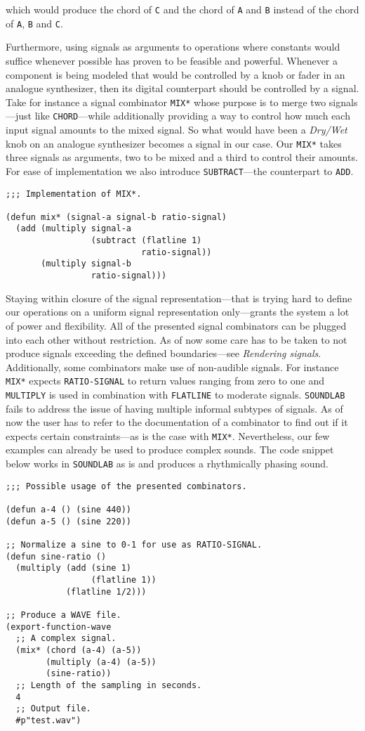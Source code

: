 which would produce the chord of \texttt{C} and the chord of \texttt{A}
and \texttt{B} instead of the chord of \texttt{A}, \texttt{B} and
\texttt{C}.

Furthermore, using signals as arguments to operations where constants
would suffice whenever possible has proven to be feasible and powerful.
Whenever a component is being modeled that would be controlled by a knob
or fader in an analogue synthesizer, then its digital counterpart should
be controlled by a signal. Take for instance a signal combinator
\texttt{MIX*} whose purpose is to merge two signals---just like
\texttt{CHORD}---while additionally providing a way to control how much
each input signal amounts to the mixed signal. So what would have been a
\textit{Dry/Wet} knob on an analogue synthesizer becomes a signal in our
case. Our \texttt{MIX*} takes three signals as arguments, two to be mixed
and a third to control their amounts. For ease of implementation we also
introduce \texttt{SUBTRACT}---the counterpart to \texttt{ADD}.

\begin{verbatim}
;;; Implementation of MIX*.

(defun mix* (signal-a signal-b ratio-signal)
  (add (multiply signal-a
                 (subtract (flatline 1)
                           ratio-signal))
       (multiply signal-b
                 ratio-signal)))
\end{verbatim}

Staying within closure of the signal representation---that is trying
hard to define our operations on a uniform signal representation
only---grants the system a lot of power and flexibility. All of the
presented signal combinators can be plugged into each other without
restriction. As of now some care has to be taken to not produce signals
exceeding the defined boundaries---see \textit{Rendering signals}.
Additionally, some combinators make use of non-audible signals. For
instance \texttt{MIX*} expects \texttt{RATIO-SIGNAL} to return values
ranging from zero to one and \texttt{MULTIPLY} is used in combination
with \texttt{FLATLINE} to moderate signals. \texttt{SOUNDLAB} fails to
address the issue of having multiple informal subtypes of signals. As of
now the user has to refer to the documentation of a combinator to find
out if it expects certain constraints---as is the case with \texttt{MIX*}.
Nevertheless, our few examples can already be used to produce complex
sounds. The code snippet below works in \texttt{SOUNDLAB} as is and
produces a rhythmically phasing sound.

\begin{verbatim}
;;; Possible usage of the presented combinators.

(defun a-4 () (sine 440))
(defun a-5 () (sine 220))

;; Normalize a sine to 0-1 for use as RATIO-SIGNAL.
(defun sine-ratio ()
  (multiply (add (sine 1)
                 (flatline 1))
            (flatline 1/2)))

;; Produce a WAVE file.
(export-function-wave
  ;; A complex signal.
  (mix* (chord (a-4) (a-5))
        (multiply (a-4) (a-5))
        (sine-ratio))
  ;; Length of the sampling in seconds.
  4
  ;; Output file.
  #p"test.wav")
\end{verbatim}
